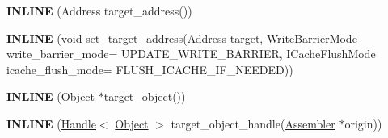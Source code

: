 \begin{DoxyCompactItemize}
\item 
{\bfseries I\+N\+L\+I\+NE} (Address target\+\_\+address())\hypertarget{classv8_1_1internal_1_1_reloc_info_a3ddf4a07c8ce0a7859c1591c5a1de96f}{}\label{classv8_1_1internal_1_1_reloc_info_a3ddf4a07c8ce0a7859c1591c5a1de96f}

\item 
{\bfseries I\+N\+L\+I\+NE} (void set\+\_\+target\+\_\+address(Address target,                                                                                                                           Write\+Barrier\+Mode write\+\_\+barrier\+\_\+mode=                                                                                                                                           U\+P\+D\+A\+T\+E\+\_\+\+W\+R\+I\+T\+E\+\_\+\+B\+A\+R\+R\+I\+ER,                                                                                                                           I\+Cache\+Flush\+Mode icache\+\_\+flush\+\_\+mode=                                                                                                                                           F\+L\+U\+S\+H\+\_\+\+I\+C\+A\+C\+H\+E\+\_\+\+I\+F\+\_\+\+N\+E\+E\+D\+ED))\hypertarget{classv8_1_1internal_1_1_reloc_info_a7d0bf808dd81935953b8c25df481c93b}{}\label{classv8_1_1internal_1_1_reloc_info_a7d0bf808dd81935953b8c25df481c93b}

\item 
{\bfseries I\+N\+L\+I\+NE} (\hyperlink{classv8_1_1internal_1_1_object}{Object} $\ast$target\+\_\+object())\hypertarget{classv8_1_1internal_1_1_reloc_info_a30056a5abdddadd54ad5f17c7f036a2b}{}\label{classv8_1_1internal_1_1_reloc_info_a30056a5abdddadd54ad5f17c7f036a2b}

\item 
{\bfseries I\+N\+L\+I\+NE} (\hyperlink{classv8_1_1internal_1_1_handle}{Handle}$<$ \hyperlink{classv8_1_1internal_1_1_object}{Object} $>$ target\+\_\+object\+\_\+handle(\hyperlink{classv8_1_1internal_1_1_assembler}{Assembler} $\ast$origin))\hypertarget{classv8_1_1internal_1_1_reloc_info_abd1a358990f0a48e294f2b420681ffeb}{}\label{classv8_1_1internal_1_1_reloc_info_abd1a358990f0a48e294f2b420681ffeb}


\end{DoxyCompactItemize}
